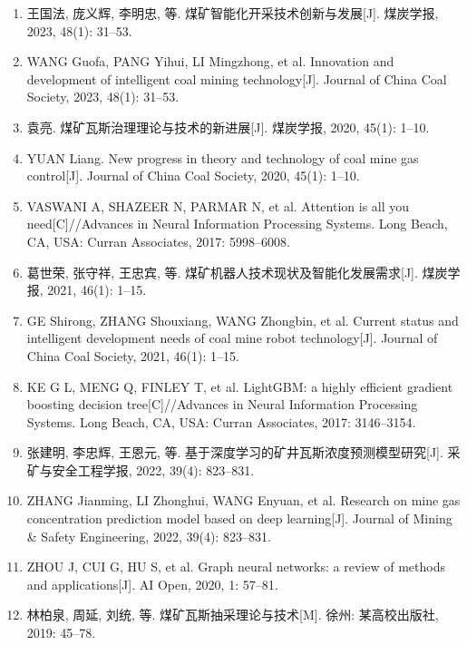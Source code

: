 \documentclass[twocolumn,a4paper]{ctexart}
\numberwithin{equation}{section}
\begin{document}
\begin{flushleft}
\begin{enumerate}
\item[{[8]}] 王国法, 庞义辉, 李明忠, 等. 煤矿智能化开采技术创新与发展[J]. 煤炭学报, 2023, 48(1): 31--53.

\item[] WANG Guofa, PANG Yihui, LI Mingzhong, et al. Innovation and development of intelligent coal mining technology[J]. Journal of China Coal Society, 2023, 48(1): 31--53.

\item[{[9]}] 袁亮. 煤矿瓦斯治理理论与技术的新进展[J]. 煤炭学报, 2020, 45(1): 1--10.

\item[] YUAN Liang. New progress in theory and technology of coal mine gas control[J]. Journal of China Coal Society, 2020, 45(1): 1--10.

\item[{[10]}] VASWANI A, SHAZEER N, PARMAR N, et al. Attention is all you need[C]//Advances in Neural Information Processing Systems. Long Beach, CA, USA: Curran Associates, 2017: 5998--6008.

\item[{[11]}] 葛世荣, 张守祥, 王忠宾, 等. 煤矿机器人技术现状及智能化发展需求[J]. 煤炭学报, 2021, 46(1): 1--15.

\item[] GE Shirong, ZHANG Shouxiang, WANG Zhongbin, et al. Current status and intelligent development needs of coal mine robot technology[J]. Journal of China Coal Society, 2021, 46(1): 1--15.

\item[{[12]}] KE G L, MENG Q, FINLEY T, et al. LightGBM: a highly efficient gradient boosting decision tree[C]//Advances in Neural Information Processing Systems. Long Beach, CA, USA: Curran Associates, 2017: 3146--3154.

\item[{[13]}] 张建明, 李忠辉, 王恩元, 等. 基于深度学习的矿井瓦斯浓度预测模型研究[J]. 采矿与安全工程学报, 2022, 39(4): 823--831.

\item[] ZHANG Jianming, LI Zhonghui, WANG Enyuan, et al. Research on mine gas concentration prediction model based on deep learning[J]. Journal of Mining \& Safety Engineering, 2022, 39(4): 823--831.

\item[{[14]}] ZHOU J, CUI G, HU S, et al. Graph neural networks: a review of methods and applications[J]. AI Open, 2020, 1: 57--81.

\item[{[15]}] 林柏泉, 周延, 刘统, 等. 煤矿瓦斯抽采理论与技术[M]. 徐州: 某高校出版社, 2019: 45--78.


\end{enumerate}
\end{flushleft}
\end{document}
